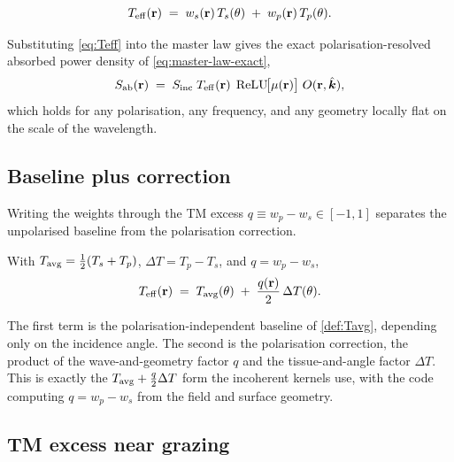 \begin{definition}\label{def:Teff}
\begin{equation}\label{eq:Teff}
  T_{\mathrm{eff}}(\mathbf{r}) \;=\; w_s(\mathbf{r})\,T_s(\theta) \;+\; w_p(\mathbf{r})\,T_p(\theta).
\end{equation}
\end{definition}

\noindent
Substituting \cref{eq:Teff} into the master law gives the exact
polarisation-resolved absorbed power density of \cref{eq:master-law-exact},
\begin{equation}\label{eq:Sab-pol}
  S_{\mathrm{ab}}(\mathbf{r}) \;=\; S_{\mathrm{inc}}\;T_{\mathrm{eff}}(\mathbf{r})\;\operatorname{ReLU}\!\bigl[\mu(\mathbf{r})\bigr]\;O(\mathbf{r},\hat{\bm{k}}),
\end{equation}
which holds for any polarisation, any frequency, and any geometry locally flat
on the scale of the wavelength.

\subsection{Baseline plus correction}\label{sec:decomp}

Writing the weights through the TM excess $q\equiv w_p-w_s\in[-1,1]$ separates
the unpolarised baseline from the polarisation correction.

\begin{proposition}\label{prop:decomp}
With $T_{\mathrm{avg}}=\tfrac{1}{2}(T_s+T_p)$, $\Delta T=T_p-T_s$, and $q=w_p-w_s$,
\begin{equation}\label{eq:Teff-decomp}
  T_{\mathrm{eff}}(\mathbf{r}) \;=\; T_{\mathrm{avg}}(\theta) \;+\; \frac{q(\mathbf{r})}{2}\,\Delta T(\theta).
\end{equation}
\end{proposition}

The first term is the polarisation-independent baseline of \cref{def:Tavg},
depending only on the incidence angle. The second is the polarisation
correction, the product of the wave-and-geometry factor $q$ and the
tissue-and-angle factor $\Delta T$. This is exactly the
$T_{\mathrm{avg}}+\tfrac{q}{2}\Delta T$ form the incoherent kernels use, with the code
computing $q=w_p-w_s$ from the field and surface geometry.

\subsection{TM excess near grazing}\label{sec:tm-excess}


